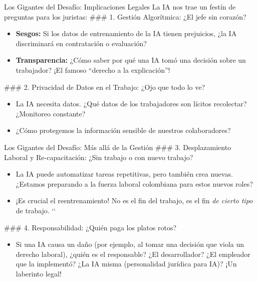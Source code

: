 \documentclass[aspectratio=169]{beamer}
\begin{document}
\begin{frame}{Los Gigantes del Desafío: Implicaciones Legales}
La IA nos trae un festín de preguntas para los juristas:
### 1. Gestión Algorítmica: ¿El jefe sin corazón?
\begin{itemize}
  \item \textbf{Sesgos:} Si los datos de entrenamiento de la IA tienen prejuicios, ¿la IA discriminará en contratación o evaluación?
  \item \textbf{Transparencia:} ¿Cómo saber por qué una IA tomó una decisión sobre un trabajador? ¡El famoso ``derecho a la explicación''!
\end{itemize}
### 2. Privacidad de Datos en el Trabajo: ¿Ojo que todo lo ve?
\begin{itemize}
  \item La IA necesita datos. ¿Qué datos de los trabajadores son lícitos recolectar? ¿Monitoreo constante?
  \item ¿Cómo protegemos la información sensible de nuestros colaboradores?
\end{itemize}
\end{frame}


\begin{frame}{Los Gigantes del Desafío: Más allá de la Gestión}
### 3. Desplazamiento Laboral y Re-capacitación: ¿Sin trabajo o con nuevo trabajo?
\begin{itemize}
  \item La IA puede automatizar tareas repetitivas, pero también crea nuevas. ¿Estamos preparando a la fuerza laboral colombiana para estos nuevos roles?
  \item ¡Es crucial el reentrenamiento! No es el fin del trabajo, es el fin \textit{de cierto tipo} de trabajo. `\cite{Gauthier, G. (2024)}`
\end{itemize}
### 4. Responsabilidad: ¿Quién paga los platos rotos?
\begin{itemize}
  \item Si una IA causa un daño (por ejemplo, al tomar una decisión que viola un derecho laboral), ¿quién es el responsable? ¿El desarrollador? ¿El empleador que la implementó? ¿La IA misma (personalidad jurídica para IA)? ¡Un laberinto legal!
\end{itemize}
\end{frame}
\end{document}
